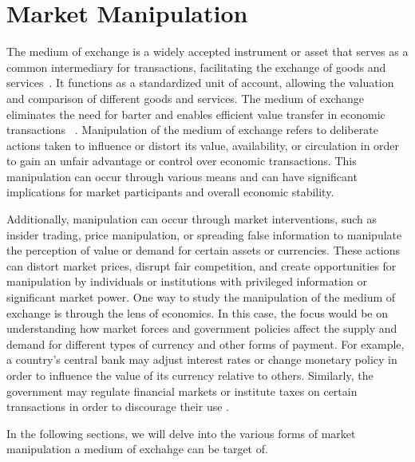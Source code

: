 \section{Market Manipulation}
The medium of exchange is a widely accepted instrument or asset that serves as a common intermediary for transactions,
facilitating the exchange of goods and services~\cite{mankiw2014principles}. It functions as a standardized unit of
account, allowing the valuation and comparison of different goods and services. The medium of exchange eliminates the
need for barter and enables efficient value transfer in economic transactions ~\cite{friedman2004money}. Manipulation of
the medium of exchange refers to deliberate actions taken to influence or distort its value, availability, or
circulation in order to gain an unfair advantage or control over economic transactions. This manipulation can occur
through various means and can have significant implications for market participants and overall economic stability.

Additionally, manipulation can occur through market interventions, such as insider trading, price manipulation, or
spreading false information to manipulate the perception of value or demand for certain assets or currencies. These
actions can distort market prices, disrupt fair competition, and create opportunities for manipulation by individuals or
institutions with privileged information or significant market power. One way to study the manipulation of the medium of
exchange is through the lens of economics. In this case, the focus would be on understanding how market forces and
government policies affect the supply and demand for different types of currency and other forms of payment. For
example, a country's central bank may adjust interest rates or change monetary policy in order to influence the value of
its currency relative to others. Similarly, the government may regulate financial markets or institute taxes on certain
transactions in order to discourage their use \cite{domanski2011currency}.

In the following sections, we will delve into the various forms of market manipulation a medium of exchahge can be
target of.



